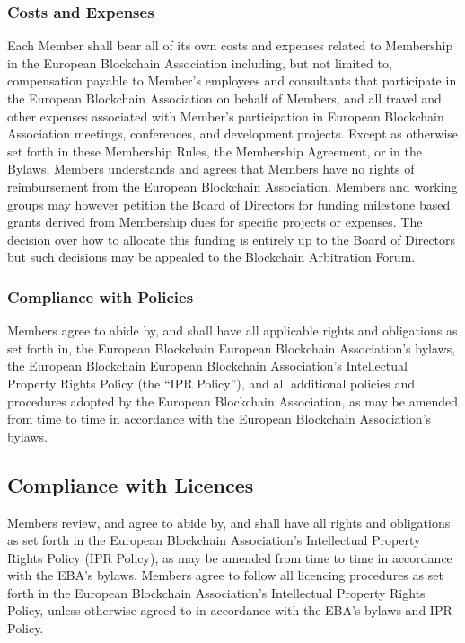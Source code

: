 \documentclass{article}
\begin{document}
\subsubsection{Costs and Expenses}

Each Member shall bear all of its own costs and expenses related to Membership in the European Blockchain Association including, but not limited to, compensation payable to Member's employees and consultants that participate in the European Blockchain Association on behalf of Members, and all travel and other expenses associated with Member's participation in European Blockchain Association meetings, conferences, and development projects. 
Except as otherwise set forth in these Membership Rules, the Membership Agreement, or in the Bylaws, Members understands and agrees that Members have no rights of reimbursement from the European Blockchain Association. 
Members and working groups may however petition the Board of Directors for funding milestone based grants derived from Membership dues for specific projects or expenses. 
The decision over how to allocate this funding is entirely up to the Board of Directors but such decisions may be appealed to the Blockchain Arbitration Forum.

\subsubsection{Compliance with Policies}

Members agree to abide by, and shall have all applicable rights and obligations as set forth in, the European Blockchain European Blockchain Association's bylaws, the European Blockchain European Blockchain Association's Intellectual Property Rights Policy (the “IPR Policy”), and all additional policies and procedures adopted by the European Blockchain Association, as may be amended from time to time in accordance with the European Blockchain Association's bylaws.

\subsection{Compliance with Licences}

Members review, and agree to abide by, and shall have all rights and obligations as set forth in the European Blockchain Association's Intellectual Property Rights Policy (IPR Policy), as may be amended from time to time in accordance with the EBA's bylaws. 
Members agree to follow all licencing procedures as set forth in the European Blockchain Association's Intellectual Property Rights Policy, unless otherwise agreed to in accordance with the EBA's bylaws and IPR Policy.
\end{document}
